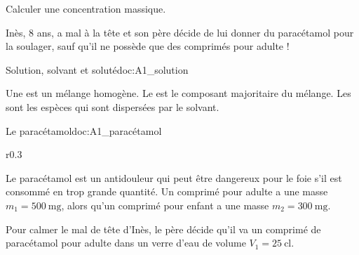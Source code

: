 \teteSndSolu

\vspace*{-36pt}

\begin{objectifs}
  \item Calculer une concentration massique.
\end{objectifs}


\begin{contexte}
  Inès, 8 ans, a mal à la tête et son père décide de lui donner du paracétamol pour la soulager, sauf qu'il ne possède que des comprimés pour adulte !

\end{contexte}


\begin{doc}{Solution, solvant et soluté}{doc:A1_solution}
  \begin{importants}
    Une  est un mélange homogène.
    Le  est le composant majoritaire du mélange.
    Les  sont les espèces qui sont dispersées par le solvant.
    \begin{center}
    \end{center}
  \end{importants}
\end{doc}

\begin{doc}{Le paracétamol}{doc:A1_paracétamol}
  \begin{wrapfigure}[5]{r}{0.3\linewidth}
    \vspace*{-24pt}
    \centering
  \end{wrapfigure}
  
  Le paracétamol est un antidouleur qui peut être dangereux pour le foie s'il est consommé en trop grande quantité.
  Un comprimé pour adulte a une masse $m_1 = \qty{500}{\milli\g}$, alors qu'un comprimé pour enfant a une masse $m_2 = \qty{300}{\milli\g}$.
  
  Pour calmer le mal de tête d'Inès, le père décide qu'il va  un comprimé de paracétamol pour adulte dans un verre d'eau de volume $V_1 = \qty{25}{\centi\litre}$.
\end{doc}



